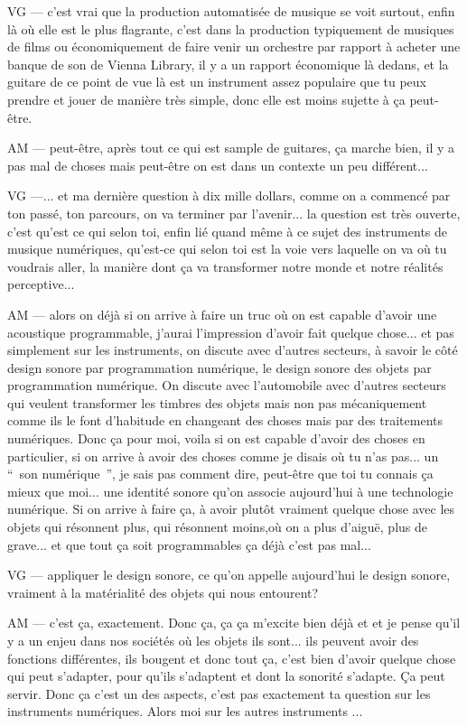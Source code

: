 VG — c'est vrai que la production automatisée de musique se voit surtout, enfin là où elle est le plus flagrante, c'est dans la production typiquement de musiques de films ou économiquement de faire venir un orchestre par rapport à acheter une banque de son de Vienna Library, il y a un rapport économique là dedans, et la guitare de ce point de vue là est un instrument assez populaire que tu peux prendre et jouer de manière très simple, donc elle est moins sujette à ça peut-être.

AM — peut-être, après tout ce qui est sample de guitares, ça marche bien, il y a pas mal de choses mais peut-être on est dans un contexte un peu différent... 

VG —... et ma dernière question à dix mille dollars, comme on a commencé par ton passé, ton parcours, on va terminer par l'avenir... la question est très ouverte, c'est qu'est ce qui selon toi, enfin lié quand même à ce sujet des instruments de musique numériques, qu'est-ce qui selon toi est la voie vers laquelle on va où tu voudrais aller, la manière dont ça va transformer notre monde et notre réalités perceptive... 

AM — alors on déjà si on arrive à faire un truc où on est capable d'avoir une acoustique programmable, j'aurai l'impression d'avoir fait quelque chose... et pas simplement sur les instruments, on discute avec d'autres secteurs, à savoir le côté design sonore par programmation numérique, le design sonore des objets par programmation numérique. On discute avec l'automobile avec d'autres secteurs qui veulent transformer les timbres des objets mais non pas mécaniquement comme ils le font d'habitude en changeant des choses mais par des traitements numériques. Donc ça pour moi, voila si on est capable d'avoir des choses en particulier, si on arrive à avoir des choses comme je disais où tu n'as pas... un “ son numérique ”, je sais pas comment dire, peut-être que toi tu connais ça mieux que moi... une identité sonore qu'on associe aujourd'hui à une technologie numérique. Si on arrive à faire ça, à avoir plutôt vraiment quelque chose avec les objets qui résonnent plus, qui résonnent moins,où on a plus d'aiguë, plus de grave... et que tout ça soit programmables ça déjà c'est pas mal... 

VG — appliquer le design sonore, ce qu'on appelle aujourd'hui le design sonore, vraiment à la matérialité des objets qui nous entourent?

AM — c'est ça, exactement. Donc ça, ça ça m'excite bien déjà et et je pense qu'il y a un enjeu dans nos sociétés où les objets ils sont... ils peuvent avoir des fonctions différentes, ils bougent et donc tout ça, c'est bien d'avoir quelque chose qui peut s'adapter, pour qu'ils s'adaptent et dont la sonorité s'adapte. Ça peut servir. Donc ça c'est un des aspects, c'est pas exactement ta question sur les instruments numériques. Alors moi sur les autres instruments ...

